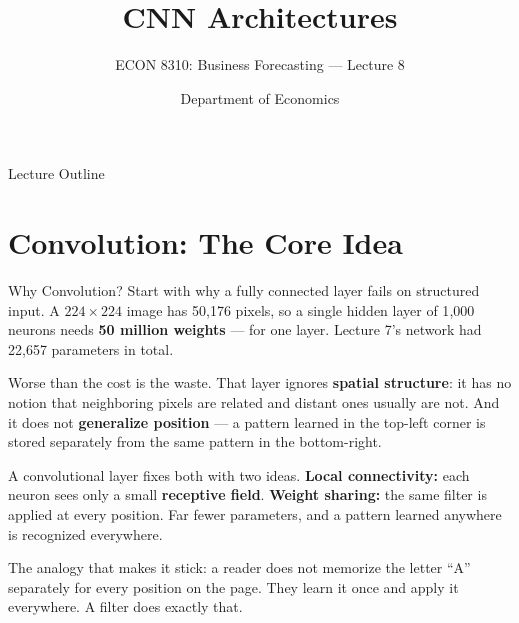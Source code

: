\documentclass[aspectratio=169, 11pt]{beamer}
\title[CNN Architectures]{CNN Architectures}
\subtitle{ECON 8310: Business Forecasting --- Lecture 8}
\author{Department of Economics}
\institute{University of Nebraska at Omaha}
\begin{document}

\begin{frame}
  \titlepage
\end{frame}

\begin{frame}{Lecture Outline}
  \tableofcontents
\end{frame}

\section{Convolution: The Core Idea}


\begin{frame}{Why Convolution?}
  Start with why a fully connected layer fails on structured input. A $224 \times 224$ image has
  50{,}176 pixels, so a single hidden layer of 1{,}000 neurons needs \textbf{50 million weights}
  --- for one layer. Lecture 7's network had 22{,}657 parameters in total.

  \vspace{0.15cm}
  Worse than the cost is the waste. That layer ignores \textbf{spatial structure}: it has no
  notion that neighboring pixels are related and distant ones usually are not. And it does not
  \textbf{generalize position} --- a pattern learned in the top-left corner is stored separately
  from the same pattern in the bottom-right.

  \begin{keybox}
    A convolutional layer fixes both with two ideas. \textbf{Local connectivity:} each neuron
    sees only a small \textbf{receptive field}. \textbf{Weight sharing:} the same filter is
    applied at every position. Far fewer parameters, and a pattern learned anywhere is
    recognized everywhere.
  \end{keybox}

  \vspace{0.1cm}
  The analogy that makes it stick: a reader does not memorize the letter ``A'' separately for
  every position on the page. They learn it once and apply it everywhere. A filter does exactly
  that.
\end{frame}
\end{document}
